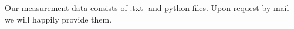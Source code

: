 \documentclass[../main.tex]{subfiles}
\begin{document}
    Our measurement data consists of .txt- and python-files. Upon request by mail we will happily provide them.
\end{document}
